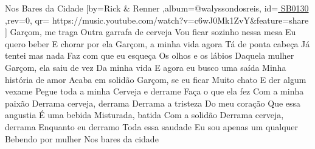 \beginsong
{Nos Bares da Cidade %
}[by={Rick \& Renner %
},album={@walyssondosreis},
id={\href{ https://music.youtube.com/watch?v=c6wJ0Mk1ZvY&feature=share
}{ SB0130  %
}},rev={0}, %
qr={ https://music.youtube.com/watch?v=c6wJ0Mk1ZvY&feature=share %
}]
\beginverse
Garçom, me traga
Outra garrafa de cerveja
Vou ficar sozinho nessa mesa
Eu quero beber
E chorar por ela
\endverse
\beginverse
Garçom, a minha vida agora
Tá de ponta cabeça
Já tentei mas nada
Faz com que eu esqueça
Os olhos e os lábios
Daquela mulher
\endverse
\beginverse
Garçom, ela saiu de vez
Da minha vida
E agora eu busco uma saída
Minha história de amor
Acaba em solidão
\endverse
\beginverse
Garçom, se eu ficar
Muito chato
E der algum vexame
Pegue toda a minha
Cerveja e derrame
Faça o que ela fez
Com a minha paixão
\endverse
\beginchorus
Derrama cerveja, derrama
Derrama a tristeza
Do meu coração
Que essa angustia
É uma bebida
Misturada, batida
Com a solidão
Derrama cerveja, derrama
Enquanto eu derramo
Toda essa saudade
Eu sou apenas um qualquer
Bebendo por mulher
Nos bares da cidade
\endchorus
\vspace{4em} %
\begin{comment}
\lstset{basicstyle=\scriptsize\bf} %
\tab{Solo 1}
\begin{lstlisting}
E|-----------------------------------------------------|
B|-----------------------------------------------------|
G|-----------------------------------------------------|
D|-----------------------------------------------------|
A|-----------------------------------------------------|
E|-----------------------------------------------------|
\end{lstlisting}
\end{comment}
